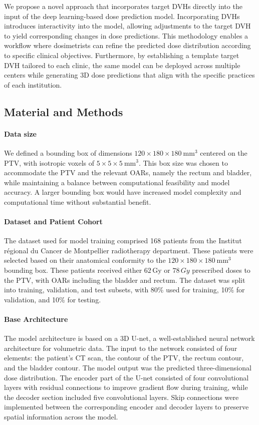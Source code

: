 We propose a novel approach that incorporates target DVHs directly into the input of the deep learning-based dose prediction model.
Incorporating DVHs introduces interactivity into the model, allowing adjustments to the target DVH to yield corresponding changes in dose predictions.
This methodology enables a workflow where dosimetrists can refine the predicted dose distribution according to specific clinical objectives.
Furthermore, by establishing a template target DVH tailored to each clinic, the same model can be deployed across multiple centers while generating 3D dose predictions that align with the specific practices of each institution.

\subsection{Material and Methods}
\paragraph{Data size}
We defined a bounding box of dimensions $120 \times 180 \times 180\ \text{mm}^3$ centered on the PTV, with isotropic voxels of $5 \times 5 \times 5\ \text{mm}^3$.
This box size was chosen to accommodate the PTV and the relevant OARs, namely the rectum and bladder, while maintaining a balance between computational feasibility and model accuracy.
A larger bounding box would have increased model complexity and computational time without substantial benefit.

\paragraph{Dataset and Patient Cohort}
The dataset used for model training comprised 168 patients from the Institut régional du Cancer de Montpellier radiotherapy department.
These patients were selected based on their anatomical conformity to the $120 \times 180 \times 180\ \text{mm}^3$ bounding box.
These patients received either $62\,\text{Gy}$ or $78\,\textit{Gy}$ prescribed doses to the PTV, with OARs including the bladder and rectum.
The dataset was split into training, validation, and test subsets, with 80\% used for training, 10\% for validation, and 10\% for testing.

\paragraph{Base Architecture}
The model architecture is based on a 3D U-net, a well-established neural network architecture for volumetric data.
The input to the network consisted of four elements: the patient's CT scan, the contour of the PTV, the rectum contour, and the bladder contour.
The model output was the predicted three-dimensional dose distribution.
The encoder part of the U-net consisted of four convolutional layers with residual connections to improve gradient flow during training, while the decoder section included five convolutional layers.
Skip connections were implemented between the corresponding encoder and decoder layers to preserve spatial information across the model.

